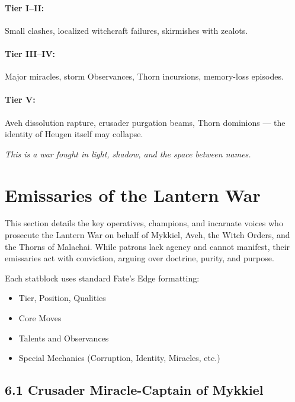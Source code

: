 \documentclass[11pt]{book}
\begin{document}
\paragraph{Tier I--II:}  
Small clashes, localized witchcraft failures, skirmishes with zealots.

\paragraph{Tier III--IV:}  
Major miracles, storm Observances, Thorn incursions, memory-loss episodes.

\paragraph{Tier V:}  
Aveh dissolution rapture, crusader purgation beams, Thorn dominions ---  
the identity of Heugen itself may collapse.

\begin{center}
\emph{This is a war fought in light, shadow, and the space between names.}
\end{center}

\section{Emissaries of the Lantern War}

This section details the key operatives, champions, and incarnate voices 
who prosecute the Lantern War on behalf of Mykkiel, Aveh, the Witch Orders, 
and the Thorns of Malachai. While patrons lack agency and cannot manifest,
their emissaries act with conviction, arguing over doctrine, purity, and purpose.

Each statblock uses standard Fate's Edge formatting:
\begin{itemize}[leftmargin=*]
    \item Tier, Position, Qualities
    \item Core Moves
    \item Talents and Observances
    \item Special Mechanics (Corruption, Identity, Miracles, etc.)
\end{itemize}

\subsection{6.1 Crusader Miracle-Captain of Mykkiel}
\end{document}
